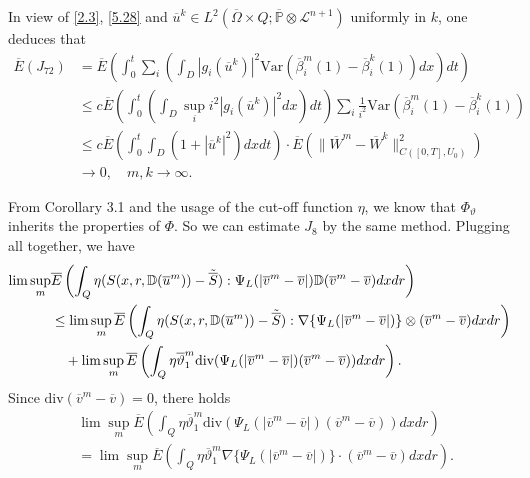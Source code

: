 \documentclass[reqno]{amsart}
\theoremstyle{definition}
\theoremstyle{remark}
\numberwithin{equation}{section} \allowdisplaybreaks
\begin{document}
In view of  \eqref{2.3}, \eqref{5.28} and $\overline{u}^k\in
L^2(\overline{\Omega}\times
Q;\overline{\mathbb{P}}\otimes\mathcal{L}^{n+1})$ uniformly in $k$,
one deduces that
\begin{align*}
\overline{E}(J_{72})&= \overline{E}\left(\int_0^t\sum_i\left(\int_D|g_i(\overline{u}^k)|^2\text{Var}\left(\overline{\beta}_i^m(1)
-\overline{\beta}_i^k(1)\right)dx\right)dt\right)\\
&\leq c\overline{E}\left(\int_0^t\left(\int_{D}\sup_ii^2|g_i(\overline{u}^k)|^2dx\right)dt\right)\sum_i\frac{1}{i^2}\text{Var}
\left(\overline{\beta}_i^m(1)-\overline{\beta}_i^k(1)\right)\\
&\leq c\overline{E}\left(\int_0^t\int_{D}(1+|\overline{u}^k|^2)dxdt\right)\cdot\overline{E}\left(\|\overline{W}^m-\overline{W}^k\|^2_{C([0,T],{U}_0)}\right)\\
&\rightarrow0,\quad m,k\rightarrow\infty.
\end{align*}

From Corollary 3.1 and the usage of the cut-off function $\eta$, we
know that $\Phi_\vartheta$ inherits the properties of $\Phi$. So we
can estimate $J_8$ by the same method.  Plugging all together, we
have
\begin{align}\label{5.56}
\notag\lim\sup_{m}&\overline{E}\left(\int_Q
\eta(S(x,r,\mathbb{D}(\overline{u}^m))-\tilde{\overline{S}}):
\Psi_L(|\overline{v}^{m}-\overline{v}|)\mathbb{D}(\overline{v}^{m}-\overline{v})dxdr\right)\\
\notag&\leq \lim\sup_{m}\overline{E}\left(\int_Q
\eta(S(x,r,\mathbb{D}(\overline{u}^m))-\tilde{\overline{S}}):\nabla\{\Psi_L(|\overline{v}^{m}-\overline{v}|)\}
\otimes(\overline{v}^{m}-\overline{v}) dx dr\right)\\
&\quad+\lim\sup_{m}\overline{E}\left(\int_Q
\eta\overline{\vartheta}_1^{m}\text{div}(\Psi_L(|\overline{v}^{m}-\overline{v}|)(\overline{v}^{m}-\overline{v}))dxdr\right).
\end{align}
Since $\text{div}(\overline{v}^{m}-\overline{v})=0$, there holds
\begin{equation*}
\begin{split}
&\lim\sup_{m}\overline{E}\left(\int_Q \eta\overline{\vartheta}_1^{m}\text{div}(\Psi_L(|\overline{v}^{m}-\overline{v}|)(\overline{v}^{m}-\overline{v}))dxdr\right)\\
&=\lim\sup_{m}\overline{E}\left(\int_Q
\eta\overline{\vartheta}_1^{m}\nabla\{\Psi_L(|\overline{v}^{m}-\overline{v}|)\}\cdot(\overline{v}^{m}-\overline{v})dxdr\right).
\end{split}
\end{equation*}
\end{document}
